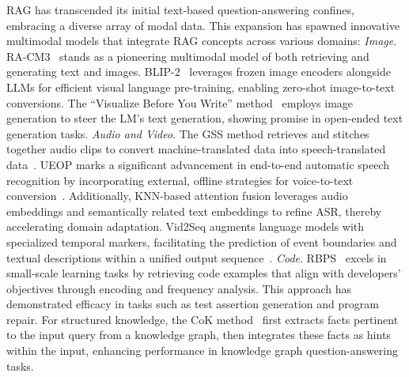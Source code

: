 RAG has transcended its initial text-based question-answering confines, embracing a diverse array of modal data. This expansion has spawned innovative multimodal models that integrate RAG concepts across various domains:
\emph{Image}. RA-CM3~ stands as a pioneering multimodal model of both retrieving and generating text and images. BLIP-2~ leverages frozen image encoders alongside LLMs for efficient visual language pre-training, enabling zero-shot image-to-text conversions. The ``Visualize Before You Write'' method~ employs image generation to steer the LM's text generation, showing promise in open-ended text generation tasks.
\emph{Audio and Video}. The GSS method retrieves and stitches together audio clips to convert machine-translated data into speech-translated data~. UEOP marks a significant advancement in end-to-end automatic speech recognition by incorporating external, offline strategies for voice-to-text conversion~. Additionally, KNN-based attention fusion leverages audio embeddings and semantically related text embeddings to refine ASR, thereby accelerating domain adaptation. Vid2Seq augments language models with specialized temporal markers, facilitating the prediction of event boundaries and textual descriptions within a unified output sequence~.
\emph{Code}.  RBPS~ excels in small-scale learning tasks by retrieving code examples that align with developers' objectives through encoding and frequency analysis. This approach has demonstrated efficacy in tasks such as test assertion generation and program repair. For structured knowledge, the CoK method~ first extracts facts pertinent to the input query from a knowledge graph, then integrates these facts as hints within the input, enhancing performance in knowledge graph question-answering tasks.

